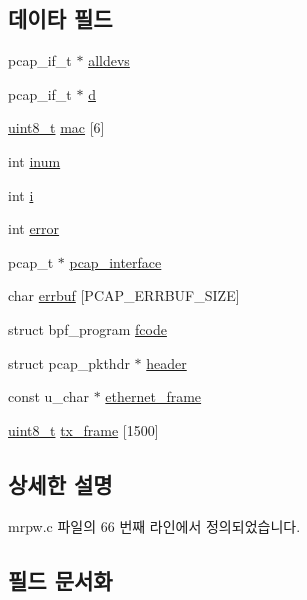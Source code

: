 \subsection*{데이타 필드}
\begin{DoxyCompactItemize}
\item 
pcap\+\_\+if\+\_\+t $\ast$ \hyperlink{structnetif_a2be2f5d8859972dbfd0a842bf7946e61}{alldevs}
\item 
pcap\+\_\+if\+\_\+t $\ast$ \hyperlink{structnetif_a6613c16cd9a1fcb4703a820d46c3789f}{d}
\item 
\hyperlink{stdint_8h_aba7bc1797add20fe3efdf37ced1182c5}{uint8\+\_\+t} \hyperlink{structnetif_a2f32c75fb4bc7ba39243ef4a9f8eacc1}{mac} \mbox{[}6\mbox{]}
\item 
int \hyperlink{structnetif_ae9094aa8dcdd11c80af350265c5872df}{inum}
\item 
int \hyperlink{structnetif_acb559820d9ca11295b4500f179ef6392}{i}
\item 
int \hyperlink{structnetif_a11614f44ef4d939bdd984953346a7572}{error}
\item 
pcap\+\_\+t $\ast$ \hyperlink{structnetif_a79b3ba185b2046dc6ed20455903d38a9}{pcap\+\_\+interface}
\item 
char \hyperlink{structnetif_a41891cad090df07cd9360f1d8a9f1396}{errbuf} \mbox{[}P\+C\+A\+P\+\_\+\+E\+R\+R\+B\+U\+F\+\_\+\+S\+I\+ZE\mbox{]}
\item 
struct bpf\+\_\+program \hyperlink{structnetif_ab5df78b3a2824a36a9a82c2c029e6c7c}{fcode}
\item 
struct pcap\+\_\+pkthdr $\ast$ \hyperlink{structnetif_a1b3d3ee1f9c1223d346a50fda4910f1f}{header}
\item 
const u\+\_\+char $\ast$ \hyperlink{structnetif_a1e5f1fe400fe4123f31b8f5a72abdc99}{ethernet\+\_\+frame}
\item 
\hyperlink{stdint_8h_aba7bc1797add20fe3efdf37ced1182c5}{uint8\+\_\+t} \hyperlink{structnetif_a3073db465b138ac609f7c659b9d12c57}{tx\+\_\+frame} \mbox{[}1500\mbox{]}
\end{DoxyCompactItemize}


\subsection{상세한 설명}


mrpw.\+c 파일의 66 번째 라인에서 정의되었습니다.



\subsection{필드 문서화}
